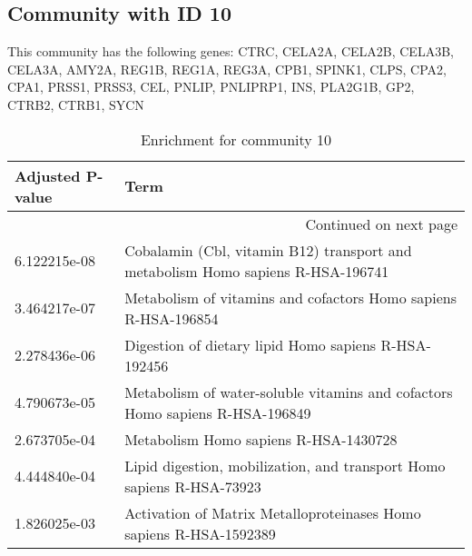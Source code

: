 \subsection*{Community with ID 10}
This community has the following genes: CTRC, CELA2A, CELA2B, CELA3B, CELA3A, AMY2A, REG1B, REG1A, REG3A, CPB1, SPINK1, CLPS, CPA2, CPA1, PRSS1, PRSS3, CEL, PNLIP, PNLIPRP1, INS, PLA2G1B, GP2, CTRB2, CTRB1, SYCN
\\
\begin{longtable}{p{2.4cm}p{14.5cm}}
\caption{Enrichment for community 10}\\
\toprule
Adjusted \newline P-value &                                                                             Term \\
\midrule
\endhead
\midrule
\multicolumn{2}{r}{{Continued on next page}} \\
\midrule
\endfoot

\bottomrule
\endlastfoot
             6.122215e-08 &  Cobalamin (Cbl, vitamin B12) transport and metabolism Homo sapiens R-HSA-196741 \\
             3.464217e-07 &                   Metabolism of vitamins and cofactors Homo sapiens R-HSA-196854 \\
             2.278436e-06 &                             Digestion of dietary lipid Homo sapiens R-HSA-192456 \\
             4.790673e-05 &     Metabolism of water-soluble vitamins and cofactors Homo sapiens R-HSA-196849 \\
             2.673705e-04 &                                            Metabolism Homo sapiens R-HSA-1430728 \\
             4.444840e-04 &            Lipid digestion, mobilization, and transport Homo sapiens R-HSA-73923 \\
             1.826025e-03 &               Activation of Matrix Metalloproteinases Homo sapiens R-HSA-1592389 \\
\end{longtable}


